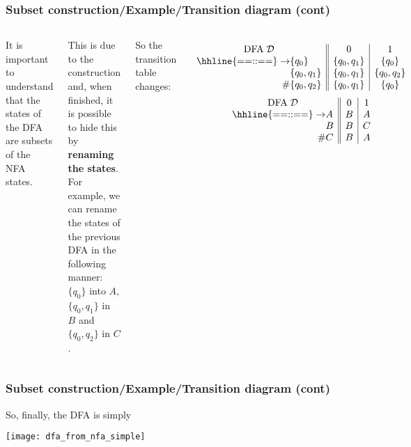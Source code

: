 % 
\begin{frame}
\frametitle{Subset construction/Example/Transition diagram (cont)}

\begin{columns}

   It is important to understand that the states
  of the DFA are subsets of the NFA states.

  \bigskip

  This is due to the construction and, when finished, it is possible
  to hide this by \textbf{renaming the states}. For example, we can
  rename the states of the previous DFA in the following manner:
  \(\{q_0\}\) into \(A\), \(\{q_0, q_1\}\) in \(B\) and \(\{q_0,
  q_2\}\) in \(C\).

  \bigskip

  So the transition table changes:

  \[
  \begin{array}{r@{}l||c|c}
    \multicolumn{2}{c||}{\text{DFA} \; {\cal D}} & 0 & 1\\
    \hhline{==::==}
    \rightarrow & \{q_0\}     & \{q_0, q_1\} & \{q_0\}\\
                & \{q_0,q_1\} & \{q_0,q_1\}  & \{q_0,q_2\}\\
             \# & \{q_0,q_2\} & \{q_0,q_1\}  & \{q_0\}
  \end{array}
  \]
  \[
  \begin{array}{r@{}l||c|c}
    \multicolumn{2}{c||}{\text{DFA} \; {\cal D}} & 0 & 1\\
    \hhline{==::==}
    \rightarrow & A & B & A\\
                & B & B & C\\
             \# & C & B & A
  \end{array}
  \]
\end{columns}

\end{frame}

% 
\begin{frame}
\frametitle{Subset construction/Example/Transition diagram (cont)}
So, finally, the DFA is simply
\begin{center}
\texttt{[image: dfa\_from\_nfa\_simple]}
\end{center}

\end{frame}

